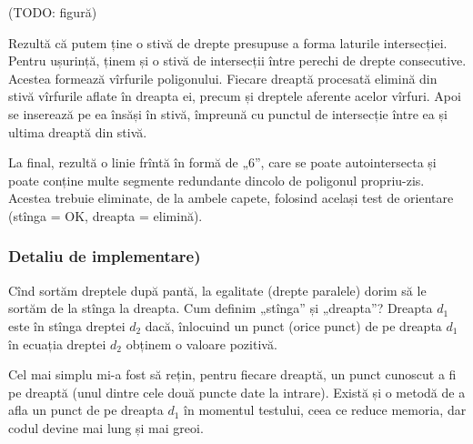 \documentclass[../main.tex]{subfiles}
\begin{document}
(TODO: figură)

Rezultă că putem ține o stivă de drepte presupuse a forma laturile intersecției. Pentru ușurință, ținem și o stivă de intersecții între perechi de drepte consecutive. Acestea formează vîrfurile poligonului. Fiecare dreaptă procesată elimină din stivă vîrfurile aflate în dreapta ei, precum și dreptele aferente acelor vîrfuri. Apoi se inserează pe ea însăși în stivă, împreună cu punctul de intersecție între ea și ultima dreaptă din stivă.

La final, rezultă o linie frîntă în formă de „6”, care se poate autointersecta și poate conține multe segmente redundante dincolo de poligonul propriu-zis. Acestea trebuie eliminate, de la ambele capete, folosind același test de orientare (stînga = OK, dreapta = elimină).

\subsubsection*{Detaliu de implementare)}

Cînd sortăm dreptele după pantă, la egalitate (drepte paralele) dorim să le sortăm de la stînga la dreapta. Cum definim „stînga” și „dreapta”? Dreapta $d_1$ este în stînga dreptei $d_2$ dacă, înlocuind un punct (orice punct) de pe dreapta $d_1$ în ecuația dreptei $d_2$ obținem o valoare pozitivă.

Cel mai simplu mi-a fost să rețin, pentru fiecare dreaptă, un punct cunoscut a fi pe dreaptă (unul dintre cele două puncte date la intrare). Există și o metodă de a afla un punct de pe dreapta $d_1$ în momentul testului, ceea ce reduce memoria, dar codul devine mai lung și mai greoi.
\end{document}
